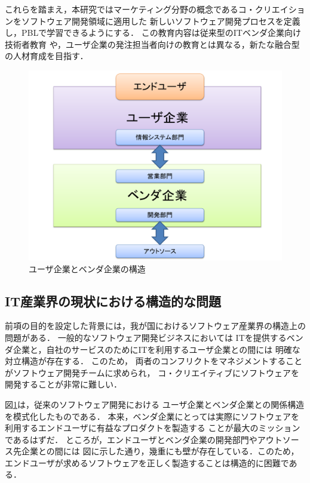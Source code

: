 \documentclass[a4j,9pt,twocolumn,twoside]{jsarticle}
\begin{document}
    これらを踏まえ，本研究ではマーケティング分野の概念であるコ・クリエイションをソフトウェア開発領域に適用した
    新しいソフトウェア開発プロセスを定義し，PBLで学習できるようにする．
    この教育内容は従来型のITベンダ企業向け技術者教育
    や，ユーザ企業の発注担当者向けの教育とは異なる，新たな融合型の人材育成を目指す．
    
\begin{figure}
\begin{center}
\includegraphics[width=0.9\linewidth]{figs/user_vendor_model.pdf}
\caption{ユーザ企業とベンダ企業の構造}
\label{fig:user_vendor_model}
\end{center}
\end{figure}
	
\subsection{IT産業界の現状における構造的な問題}
    前項の目的を設定した背景には，我が国におけるソフトウェア産業界の構造上の問題がある．
	一般的なソフトウェア開発ビジネスにおいては    
    ITを提供するベンダ企業と，自社のサービスのためにITを利用するユーザ企業との間には
    明確な対立構造が存在する．
    このため，
    両者のコンフリクトをマネジメントすることがソフトウェア開発チームに求められ，
    コ・クリエイティブにソフトウェアを開発することが非常に難しい．
    
    図\ref{fig:user_vendor_model}は，従来のソフトウェア開発における
    ユーザ企業とベンダ企業との関係構造を模式化したものである．
    本来，ベンダ企業にとっては実際にソフトウェアを利用するエンドユーザに有益なプロダクトを製造する
    ことが最大のミッションであるはずだ．
    ところが，エンドユーザとベンダ企業の開発部門やアウトソース先企業との間には
    図に示した通り，幾重にも壁が存在している．このため，
    エンドユーザが求めるソフトウェアを正しく製造することは構造的に困難である．
    
\end{document}
